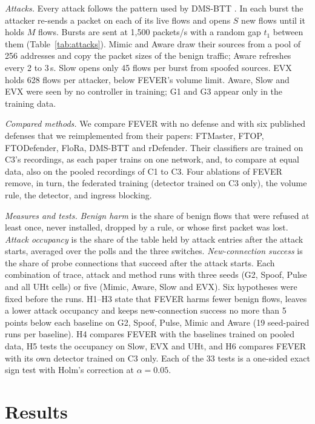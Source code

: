 \documentclass[conference]{IEEEtran}
\begin{document}
\textit{Attacks.} Every attack follows the pattern used by DMS-BTT \cite{tang2025dmsbtt}. In each burst
the attacker re-sends a packet on each of its live flows and opens $S$ new flows until it holds $M$
flows. Bursts are sent at 1,500 packets/s with a random gap $t_1$ between them (Table~\ref{tab:attacks}).
Mimic and Aware draw their sources from a pool of 256 addresses and copy the packet sizes of the benign
traffic; Aware refreshes every 2 to 3\,s. Slow opens only 45 flows per burst from spoofed sources. EVX
holds 628 flows per attacker, below FEVER's volume limit. Aware, Slow and EVX were seen by no controller
in training; G1 and G3 appear only in the training data.



\textit{Compared methods.} We compare FEVER with no defense and with six published defenses that we
reimplemented from their papers: FTMaster, FTOP, FTODefender, FloRa, DMS-BTT and rDefender. Their
classifiers are trained on C3's recordings, as each paper trains on one network, and, to compare at equal
data, also on the pooled recordings of C1 to C3. Four ablations of FEVER remove, in turn, the federated
training (detector trained on C3 only), the volume rule, the detector, and ingress blocking.

\textit{Measures and tests.} \textit{Benign harm} is the share of benign flows that were refused at least
once, never installed, dropped by a rule, or whose first packet was lost. \textit{Attack occupancy} is
the share of the table held by attack entries after the attack starts, averaged over the polls and the
three switches. \textit{New-connection success} is the share of probe connections that succeed after the
attack starts. Each combination of trace, attack and method runs with three seeds (G2, Spoof, Pulse and
all UHt cells) or five (Mimic, Aware, Slow and EVX). Six hypotheses were fixed before the runs. H1--H3
state that FEVER harms fewer benign flows, leaves a lower attack occupancy and keeps new-connection
success no more than 5 points below each baseline on G2, Spoof, Pulse, Mimic and Aware (19 seed-paired
runs per baseline). H4 compares FEVER with the baselines trained on pooled data, H5 tests the occupancy
on Slow, EVX and UHt, and H6 compares FEVER with its own detector trained on C3 only. Each of the 33 tests
is a one-sided exact sign test with Holm's correction \cite{holm1979} at $\alpha = 0.05$.

\section{Results}
\label{sec:results}
\end{document}
